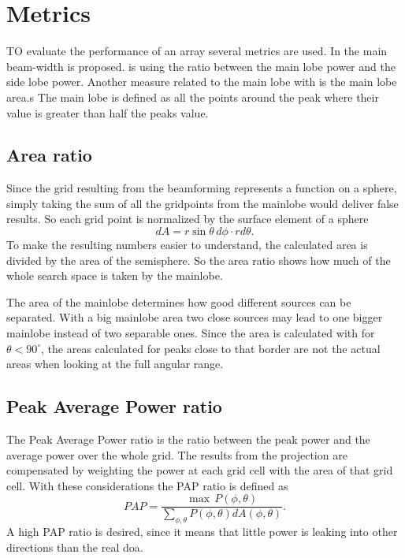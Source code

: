 \section{Metrics}
\label{sec:metrics}
TO evaluate the performance of an array several metrics are used.
In  the
main beam-width is proposed.
 is using the ratio
between the main lobe power and the side lobe power.
Another measure related to the main lobe with is the main lobe area.s
The main lobe is defined as all the points around the peak where their value
is greater than half the peaks value. 

\subsection{Area ratio}
Since the grid resulting from the beamforming represents a function on a sphere,
simply taking the sum of all the gridpoints from the mainlobe
would deliver false results.
So each grid point is normalized by the surface element of a sphere
\begin{equation}
	dA = r \sin\theta \, d\phi \cdot r d\theta.
\end{equation}
To make the resulting numbers easier to understand, the calculated area is divided
by the area of the semisphere.
So the area ratio shows how much of the whole search space is taken by the mainlobe.

The area of the mainlobe determines how good different sources can be separated.
With a big mainlobe area two close sources may lead to one bigger mainlobe instead
of two separable ones.
Since the area is calculated with for $\theta < 90^\circ$, the areas calculated
for peaks close to that border are not the actual areas when looking at the 
full angular range.


\subsection{Peak Average Power ratio}
The Peak Average Power ratio is the ratio between the peak power and
the average power over the whole grid.
The results from the projection are compensated by weighting
the power at each grid cell with the area of that grid cell.
With these considerations the PAP ratio is defined as
\begin{equation}
	PAP = \frac{\max \, P(\phi, \theta)}{\sum_{\phi, \theta}^{} P(\phi, \theta) dA(\phi, \theta)}.
\end{equation}
A high PAP ratio is desired, since it means that little power is leaking 
into other directions than the real \acrshort{doa}.
